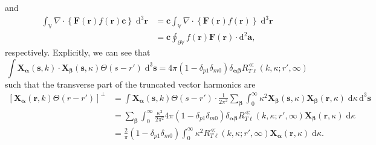 \documentclass{article}
\begin{document}
and
\begin{equation}\label{eq:generalizedDivergenceTheorem}
\begin{split}
\int_\mathbb{V}\nabla\cdot\left\{\mathbf{F}(\mathbf{r})f(\mathbf{r})\mathbf{c}\right\}\;\mathrm{d}^3\mathbf{r} &= \mathbf{c}\int_\mathbb{V}\nabla\cdot\left\{\mathbf{F}(\mathbf{r})f(\mathbf{r})\right\}\;\mathrm{d}^3\mathbf{r}\\
&= \mathbf{c}\oint_{\partial\mathbb{V}} f(\mathbf{r})\mathbf{F}(\mathbf{r})\cdot\mathrm{d}^2\mathbf{a},
\end{split}
\end{equation} 
respectively. Explicitly, we can see that
\begin{equation}
\int\mathbf{X}_{\bm{\alpha}}(\mathbf{s},k)\cdot\mathbf{X}_{\bm{\beta}}(\mathbf{s},\kappa)\Theta(s - r')\;\mathrm{d}^3\mathbf{s} = 4\pi(1 - \delta_{p1}\delta_{m0})\delta_{\bm{\alpha}\bm{\beta}}R^\ll_{T\ell}(k,\kappa;r',\infty)
\end{equation}
such that the transverse part of the truncated vector harmonics are
\begin{equation}
\begin{split}
\left[\mathbf{X}_{\bm{\alpha}}(\mathbf{r},k)\Theta(r - r')\right]^\perp &= \int\mathbf{X}_{\bm{\alpha}}(\mathbf{s},k)\Theta(s - r')\cdot\frac{1}{2\pi^2}\sum_{\bm{\beta}}\int_0^\infty\kappa^2\mathbf{X}_{\bm{\beta}}(\mathbf{s},\kappa)\mathbf{X}_{\bm{\beta}}(\mathbf{r},\kappa)\;\mathrm{d}\kappa\,\mathrm{d}^3\mathbf{s}\\
&= \sum_{\bm{\beta}}\int_0^\infty \frac{\kappa^2}{2\pi^2}4\pi(1 - \delta_{p1}\delta_{m0})\delta_{\bm{\alpha}\bm{\beta}}R_{T\ell}^\ll(k,\kappa;r',\infty)\mathbf{X}_{\bm{\beta}}(\mathbf{r},\kappa)\;\mathrm{d}\kappa\\
&= \frac{2}{\pi}(1 - \delta_{p1}\delta_{m0})\int_0^\infty \kappa^2R_{T\ell}^\ll(k,\kappa;r',\infty)\mathbf{X}_{\bm{\alpha}}(\mathbf{r},\kappa)\;\mathrm{d}\kappa.
\end{split}
\end{equation}
\end{document}
